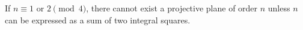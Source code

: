 If $n \equiv 1 \text{ or } 2 \pmod{4}$, there cannot exist a projective plane of order $n$ unless $n$ can be expressed as a sum of two integral squares.
